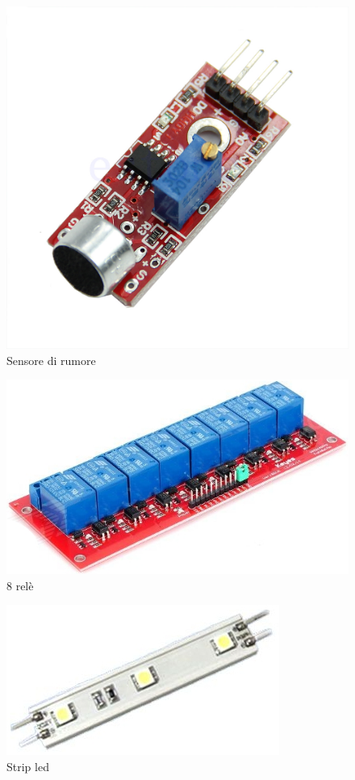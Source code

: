 \documentclass[a4paper,titlepage]{book}
\begin{document}
\begin{figure}[!h]
\centering
\includegraphics[scale=0.2]{mic.jpg}
\caption{Sensore di rumore}
\end{figure}


\begin{figure}[!h]
\centering
\includegraphics[scale=0.5]{rele.jpg}
\caption{8 relè}
\end{figure}

\begin{figure}[!h]
\centering
\includegraphics[scale=0.5]{led.jpg}
\caption{Strip led}
\end{figure}
\end{document}
